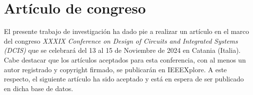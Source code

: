 
\chapter{Artículo de congreso} %

\label{Articulo} %

El presente trabajo de investigación ha dado pie a realizar un artículo en el marco del congreso \textit{XXXIX Conference on Design of Circuits and Integrated Systems (DCIS)} que se celebrará del 13 al 15 de Noviembre de 2024 en Catania (Italia).
Cabe destacar que los artículos aceptados para esta conferencia, con al menos un autor registrado y copyright firmado, se publicarán en IEEEXplore.
A este respecto, el siguiente artículo ha sido aceptado y está en espera de ser publicado en dicha base de datos.


%
